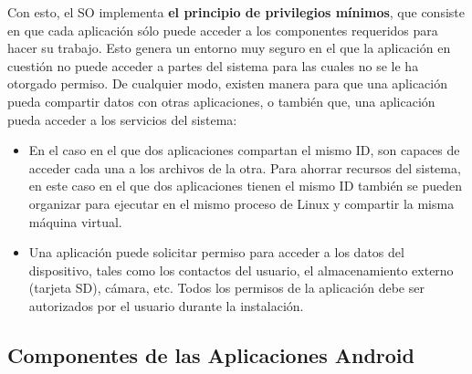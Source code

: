 Con esto, el SO implementa \textbf{el principio de privilegios mínimos}, que consiste en que cada aplicación sólo puede acceder a los componentes requeridos para hacer su trabajo. Esto genera un entorno muy seguro en el que la aplicación en cuestión no puede acceder a partes del sistema para las cuales no se le ha otorgado permiso. 
De cualquier modo, existen manera para que una aplicación pueda compartir datos con otras aplicaciones, o también que, una aplicación pueda acceder a los servicios del sistema: 
\begin{itemize}
	
	\item En el caso en el que dos aplicaciones compartan el mismo ID, son capaces de acceder cada una a los archivos de la otra. Para ahorrar recursos del sistema, en este caso en el que dos aplicaciones tienen el mismo ID también se pueden organizar para ejecutar en el mismo proceso de Linux y compartir la misma máquina virtual.  
	
	\item Una aplicación puede solicitar permiso para acceder a los datos del dispositivo, tales como los contactos del usuario, el almacenamiento externo (tarjeta SD), cámara, etc. Todos los permisos de la aplicación debe ser autorizados por el usuario durante la instalación.  
\end{itemize}

\subsection{Componentes de las Aplicaciones Android}

